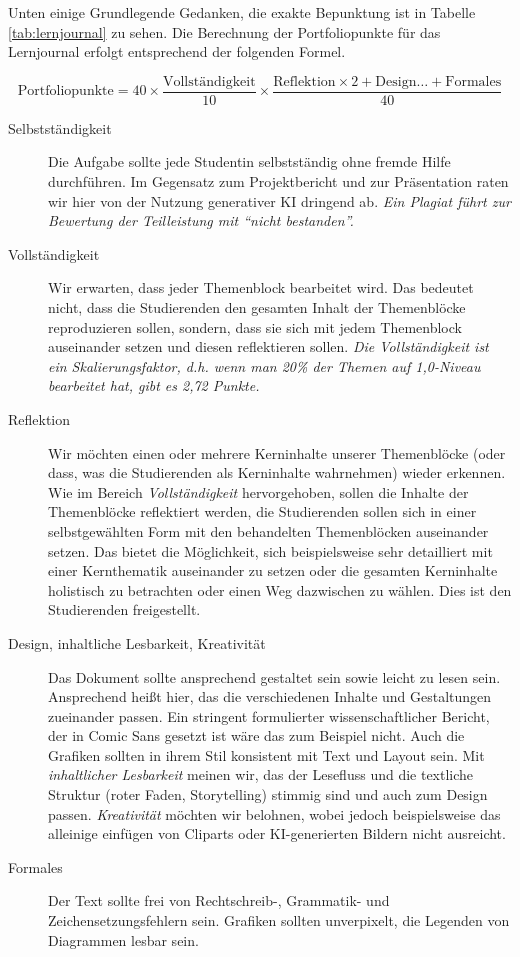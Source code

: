 \documentclass[DIV=15,headinclude=true]{scrreprt}
\begin{document}
Unten einige Grundlegende Gedanken, die exakte Bepunktung ist in
Tabelle \ref{tab:lernjournal} zu sehen. Die Berechnung der Portfoliopunkte für das Lernjournal erfolgt entsprechend der folgenden Formel.

\begin{equation*}
	\text{Portfoliopunkte} = 40 \times \frac{\text{Vollständigkeit}}{10} \times \frac{\text{Reflektion} \times 2 + \text{Design…} + \text{Formales}}{40}
\end{equation*}

\begin{description}
	\item[Selbstständigkeit]
		Die Aufgabe sollte jede Studentin selbstständig ohne fremde Hilfe
		durchführen. Im Gegensatz zum Projektbericht und zur Präsentation raten wir hier von der Nutzung generativer KI dringend ab. \emph{Ein Plagiat führt zur Bewertung der Teilleistung mit ``nicht bestanden''.}
	\item[Vollständigkeit]
		Wir erwarten, dass jeder Themenblock bearbeitet wird. Das bedeutet
		nicht, dass die Studierenden den gesamten Inhalt der Themenblöcke
		reproduzieren sollen, sondern, dass sie sich mit jedem Themenblock
		auseinander setzen und diesen reflektieren sollen. \emph{Die Vollständigkeit ist ein Skalierungsfaktor, d.h. wenn man 20\% der Themen auf 1,0-Niveau bearbeitet hat, gibt es 2,72 Punkte.}
	\item[Reflektion]
		Wir möchten einen oder mehrere Kerninhalte unserer Themenblöcke (oder
		dass, was die Studierenden als Kerninhalte wahrnehmen) wieder erkennen.
		Wie im Bereich \emph{Vollständigkeit} hervorgehoben, sollen die Inhalte
		der Themenblöcke reflektiert werden, die Studierenden sollen sich in
		einer selbstgewählten Form mit den behandelten Themenblöcken auseinander
		setzen. Das bietet die Möglichkeit, sich beispielsweise sehr detailliert
		mit einer Kernthematik auseinander zu setzen oder die gesamten
		Kerninhalte holistisch zu betrachten oder einen Weg dazwischen zu
		wählen. Dies ist den Studierenden freigestellt.
	\item[Design, inhaltliche Lesbarkeit, Kreativität] Das Dokument sollte ansprechend gestaltet sein sowie leicht zu lesen sein. Ansprechend heißt hier, das die verschiedenen Inhalte und Gestaltungen zueinander passen. Ein stringent formulierter wissenschaftlicher Bericht, der in Comic Sans gesetzt ist wäre das zum Beispiel nicht. Auch die Grafiken sollten in ihrem Stil konsistent mit Text und Layout sein. Mit \emph{inhaltlicher Lesbarkeit} meinen wir, das der Lesefluss und die textliche Struktur (roter Faden, Storytelling) stimmig sind und auch zum Design passen. \emph{Kreativität} möchten wir belohnen, wobei jedoch beispielsweise das alleinige einfügen von Cliparts oder KI-generierten Bildern nicht ausreicht.
	\item[Formales]
		Der Text sollte frei von Rechtschreib-, Grammatik- und Zeichensetzungsfehlern sein. Grafiken sollten unverpixelt, die Legenden von Diagrammen lesbar sein.
\end{description}
\end{document}
